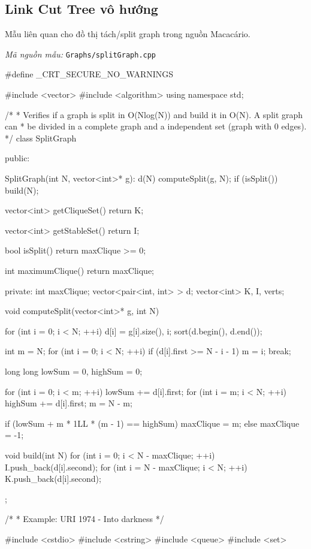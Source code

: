 \documentclass[11pt]{article}
\newcommand{\codepath}[1]{\par\noindent\textit{Mã nguồn mẫu:} \texttt{#1}\par}
\begin{document}
\subsection{Link Cut Tree vô hướng}

Mẫu liên quan cho đồ thị tách/split graph trong nguồn Macacário.

\codepath{Graphs/splitGraph.cpp}

\begingroup\scriptsize
\begin{vncode}
#define _CRT_SECURE_NO_WARNINGS

#include <vector>
#include <algorithm>
using namespace std;

/*
* Verifies if a graph is split in O(Nlog(N)) and build it in O(N). A split graph can
* be divided in a complete graph and a independent set (graph with 0 edges).
*/
class SplitGraph {

public:

	SplitGraph(int N, vector<int>* g): d(N)
	{
		computeSplit(g, N);
		if (isSplit()) build(N);
	}

	vector<int> getCliqueSet(){
		return K;
	}

	vector<int> getStableSet(){
		return I;
	}

	bool isSplit() {
		return maxClique >= 0;
	}

	int maximumClique() {
		return maxClique;
	}

private:
	int maxClique;
	vector<pair<int, int> > d;
	vector<int> K, I, verts;

	void computeSplit(vector<int>* g, int N) {
		for (int i = 0; i < N; ++i) d[i] = {g[i].size(), i};
		sort(d.begin(), d.end());

		int m = N;
		for (int i = 0; i < N; ++i) {
			if (d[i].first >= N - i - 1) {
				m = i;
				break;
			}
		}

		long long lowSum = 0, highSum = 0;

		for (int i = 0; i < m; ++i) lowSum += d[i].first;
		for (int i = m; i < N; ++i) highSum += d[i].first;
		m = N - m;

		if (lowSum + m * 1LL * (m - 1) == highSum) {
			maxClique = m;
		}
		else {
			maxClique = -1;
		}
	}

	void build(int N){
		for (int i = 0; i < N - maxClique; ++i){
			I.push_back(d[i].second);
		}for (int i = N - maxClique; i < N; ++i){
			K.push_back(d[i].second);
		}
	}

};

/*
* Example: URI 1974 - Into darkness
*/

#include <cstdio>
#include <cstring>
#include <queue>
#include <set>


\end{vncode}
\end{document}
